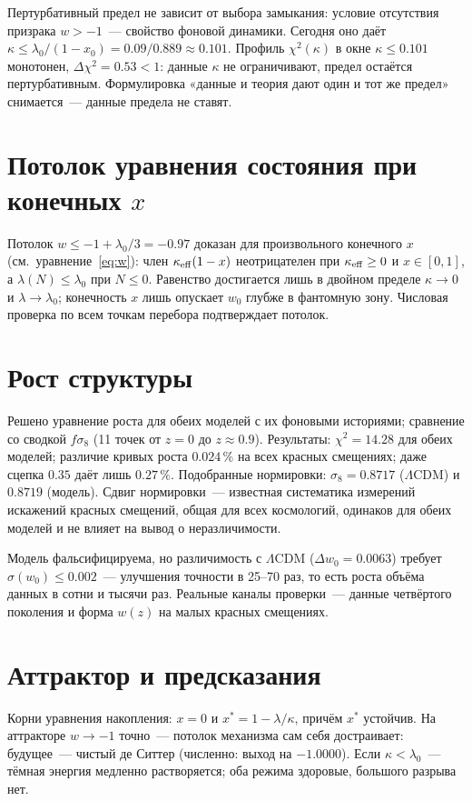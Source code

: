 \documentclass[11pt,a4paper]{article}
\begin{document}
Пертурбативный предел не зависит от выбора замыкания: условие отсутствия призрака $w>-1$~--- свойство фоновой динамики. Сегодня оно даёт $\kappa\le\lambda_0/(1-x_0)=0.09/0.889\approx0.101$. Профиль $\chi^2(\kappa)$ в окне $\kappa\le0.101$ монотонен, $\Delta\chi^2=0.53<1$: данные $\kappa$ не ограничивают, предел остаётся пертурбативным. Формулировка «данные и теория дают один и тот же предел» снимается~--- данные предела не ставят.

\section{Потолок уравнения состояния при конечных $x$}
Потолок $w\le-1+\lambda_0/3=-0.97$ доказан для произвольного конечного $x$ (см.\ уравнение~\eqref{eq:w}): член $\kappa_{\rm eff}(1-x)$ неотрицателен при $\kappa_{\rm eff}\ge0$ и $x\in[0,1]$, а $\lambda(N)\le\lambda_0$ при $N\le0$. Равенство достигается лишь в двойном пределе $\kappa\to0$ и $\lambda\to\lambda_0$; конечность $x$ лишь опускает $w_0$ глубже в фантомную зону. Числовая проверка по всем точкам перебора подтверждает потолок.

\section{Рост структуры}
Решено уравнение роста для обеих моделей с их фоновыми историями; сравнение со сводкой $f\sigma_8$ (11 точек от $z=0$ до $z\approx0.9$). Результаты: $\chi^2=14.28$ для обеих моделей; различие кривых роста $0.024\,\%$ на всех красных смещениях; даже сцепка $0.35$ даёт лишь $0.27\,\%$. Подобранные нормировки: $\sigma_8=0.8717$ ($\Lambda$CDM) и $0.8719$ (модель). Сдвиг нормировки~--- известная систематика измерений искажений красных смещений, общая для всех космологий, одинаков для обеих моделей и не влияет на вывод о неразличимости.

Модель фальсифицируема, но различимость с $\Lambda$CDM ($\Delta w_0=0.0063$) требует $\sigma(w_0)\le0.002$~--- улучшения точности в 25--70 раз, то есть роста объёма данных в сотни и тысячи раз. Реальные каналы проверки~--- данные четвёртого поколения и форма $w(z)$ на малых красных смещениях.

\section{Аттрактор и предсказания}
Корни уравнения накопления: $x=0$ и $x^*=1-\lambda/\kappa$, причём $x^*$ устойчив. На аттракторе $w\to-1$ точно~--- потолок механизма сам себя достраивает: будущее~--- чистый де Ситтер (численно: выход на $-1.0000$). Если $\kappa<\lambda_0$~--- тёмная энергия медленно растворяется; оба режима здоровые, большого разрыва нет.
\end{document}
